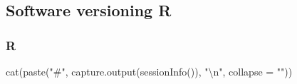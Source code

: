 \documentclass[
  12pt,
]{article}
\newenvironment{Shaded}{\begin{snugshade}}{\end{snugshade}}
\newcommand{\AttributeTok}[1]{\textcolor[rgb]{0.77,0.63,0.00}{#1}}
\newcommand{\FunctionTok}[1]{\textcolor[rgb]{0.00,0.00,0.00}{#1}}
\newcommand{\NormalTok}[1]{#1}
\newcommand{\SpecialCharTok}[1]{\textcolor[rgb]{0.00,0.00,0.00}{#1}}
\newcommand{\StringTok}[1]{\textcolor[rgb]{0.31,0.60,0.02}{#1}}
\begin{document}
\hypertarget{software-versioning-r}{%
\subsection{Software versioning R}\label{software-versioning-r}}

\hypertarget{r}{%
\subsubsection{R}\label{r}}

\begin{Shaded}
\begin{Highlighting}[]
\FunctionTok{cat}\NormalTok{(}\FunctionTok{paste}\NormalTok{(}\StringTok{"\#"}\NormalTok{, }\FunctionTok{capture.output}\NormalTok{(}\FunctionTok{sessionInfo}\NormalTok{()), }\StringTok{"}\SpecialCharTok{\textbackslash{}n}\StringTok{"}\NormalTok{, }\AttributeTok{collapse  =} \StringTok{""}\NormalTok{))}
\end{Highlighting}
\end{Shaded}
\end{document}
